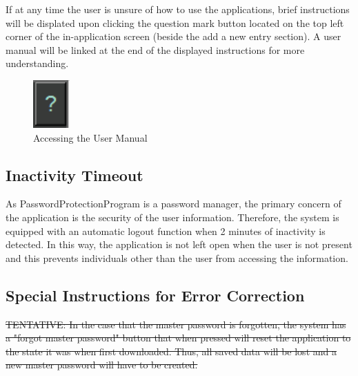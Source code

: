 \documentclass[12pt, titlepage]{article}
\begin{document}
If at any time the user is unsure of how to use the applications, brief instructions will be displated upon clicking the question mark button located on the top left corner of the in-application screen (beside the add a new entry section). A user manual will be linked at the end of the displayed instructions for more understanding. 

\begin{figure}[h]
	\centering
	\includegraphics[scale=1.0]{images/UserManual.PNG}
	\caption{Accessing the User Manual}
	\label{fig:UsMan}
\end{figure}

\subsection{Inactivity Timeout} \label{InacTime}

As PasswordProtectionProgram is a password manager, the primary concern of the application is the security of the user information. Therefore, the system is equipped with an automatic logout function when 2 minutes of inactivity is detected. In this way, the application is not left open when the user is not present and this prevents individuals other than the user from accessing the information.

\subsection{Special Instructions for Error Correction} \label{ErrCorr}

\sout{TENTATIVE: In the case that the master password is forgotten, the system has a "forgot master password" button that when pressed will reset the application to the state it was when first downloaded. Thus, all saved data will be lost and a new master password will have to be created.}

\newpage



\end{document}
